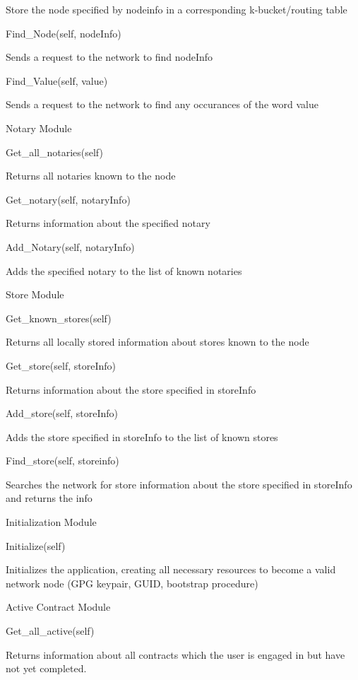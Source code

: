\documentclass{article}
\begin{document}
        Store the node specified by nodeinfo in a corresponding k-bucket/routing table 

    Find_Node(self, nodeInfo) 

        Sends a request to the network to find nodeInfo 

    Find_Value(self, value) 

        Sends a request to the network to find any occurances of the word value 

     

     

Notary Module 

    Get_all_notaries(self) 

        Returns all notaries known to the node 

    Get_notary(self, notaryInfo) 

        Returns information about the specified notary 

    Add_Notary(self, notaryInfo) 

        Adds the specified notary to the list of known notaries 

     

     

Store Module 

    Get_known_stores(self) 

        Returns all locally stored information about stores known to the node 

    Get_store(self, storeInfo) 

        Returns information about the store specified in storeInfo 

    Add_store(self, storeInfo) 

        Adds the store specified in storeInfo to the list of known stores 

    Find_store(self, storeinfo) 

        Searches the network for store information about the store specified in storeInfo and returns the info 

 
Initialization Module 

    Initialize(self) 

        Initializes the application, creating all necessary resources to become a valid network node (GPG keypair, GUID, bootstrap procedure) 

     

Active Contract Module 

    Get_all_active(self) 

        Returns information about all contracts which the user is engaged in but have not yet completed. 
\end{document}
